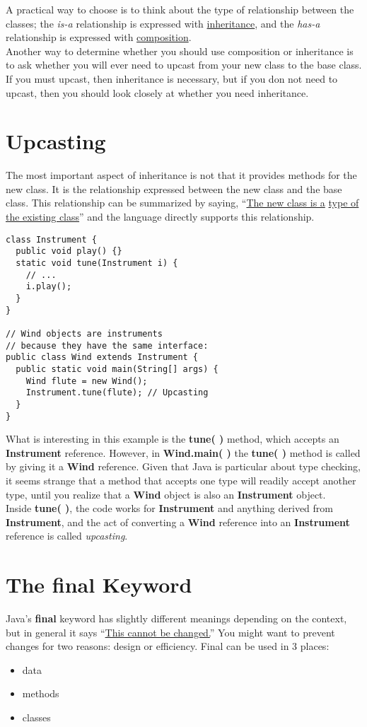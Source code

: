 \documentclass[10pt,letterpaper]{report}
\begin{document}
A practical way to choose is to think about the type of relationship between the classes; the \textit{is-a} relationship is expressed with \underline{inheritance}, and the \textit{has-a} relationship is expressed with \underline{composition}.\\

Another way to determine whether you should use composition or inheritance is to ask whether you will ever need to upcast from your new class to the base class. If you must upcast, then inheritance is necessary, but if you don not need to upcast, then you should look closely at whether you need inheritance.
\section{Upcasting}
The most important aspect of inheritance is not that it provides methods for the new class. It is the relationship expressed between the new class and the base class. This relationship can be summarized by saying, ``\underline{The new class is a} \underline{type of the existing class}'' and the language directly supports this relationship.
\begin{lstlisting}
class Instrument {
  public void play() {}
  static void tune(Instrument i) {
    // ...
    i.play();
  }
}

// Wind objects are instruments
// because they have the same interface:
public class Wind extends Instrument {
  public static void main(String[] args) {
    Wind flute = new Wind();
    Instrument.tune(flute); // Upcasting
  }
}
\end{lstlisting}
What is interesting in this example is the \textbf{tune( )} method, which accepts an \textbf{Instrument} reference. However, in \textbf{Wind.main( )} the \textbf{tune( )} method is called by giving it a \textbf{Wind} reference. Given that Java is particular about type checking, it seems strange that a method that accepts one type will readily accept another type, until you realize that a \textbf{Wind} object is also an \textbf{Instrument} object.\\

Inside \textbf{tune( )}, the code works for \textbf{Instrument} and anything derived from \textbf{Instrument}, and the act of converting a \textbf{Wind} reference into an \textbf{Instrument} reference is called \textit{upcasting}.
\section{The final Keyword}
Java's \textbf{final} keyword has slightly different meanings depending on the context, but in general it says ``\underline{This cannot be changed.}'' You might want to prevent changes for two reasons: design or efficiency.
Final can be used in 3 places:
\begin{itemize}
\item data
\item methods
\item classes
\end{itemize}
\end{document}
